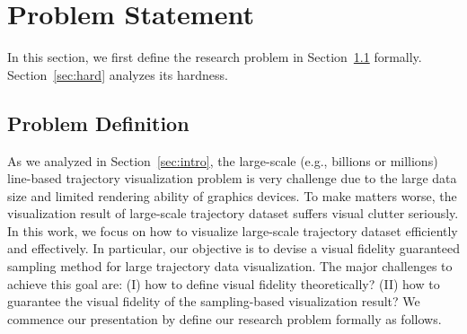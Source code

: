 \section{Problem Statement}\label{sec:pro}
In this section, we first define the research problem in Section~\ref{sec:def} formally.
Section~\ref{sec:hard} analyzes its hardness.
%


\subsection{Problem Definition}\label{sec:def}
As we analyzed in Section~\ref{sec:intro}, the large-scale (e.g., billions or millions) line-based trajectory visualization problem is very challenge due to the large data size and limited rendering ability of graphics devices.
To make matters worse, the visualization result of large-scale trajectory dataset suffers visual clutter seriously.
In this work, we focus on how to visualize large-scale trajectory dataset efficiently and effectively.
In particular, our objective is to devise a visual fidelity guaranteed sampling method for large trajectory data visualization.
The major challenges to achieve this goal are:
(I) how to define visual fidelity theoretically? (II) how to guarantee the visual fidelity of the sampling-based visualization result?
We commence our presentation by define our research problem formally as follows.

